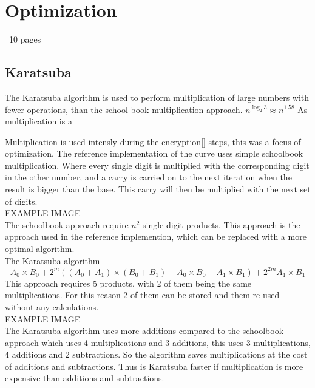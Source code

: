 \section{Optimization}
~10 pages

\subsection{Karatsuba}
The Karatsuba algorithm is used to perform multiplication of large numbers with fewer operations, than the school-book multiplication approach.
$n^{\log_{2}3} \approx n^{1.58}$
As multiplication is a 

Multiplication is used intensly during the encryption[] steps, this was a focus of optimization. The reference implementation of the curve uses simple schoolbook multiplication.
Where every single digit is multiplied with the corresponding digit in the other number, and a carry is carried on to the next iteration when the result is bigger than the base. This carry will then be multiplied with the next set of digits.\\
EXAMPLE IMAGE\\
The schoolbook approach require $n^{2}$ single-digit products. 
This approach is the approach used in the reference implemention, which can be replaced with a more optimal algorithm.
\\

The Karatsuba algorithm 
\[A_0 \times B_0 + 2^{m}((A_0 + A_1) \times (B_0 + B_1) - A_0 \times B_0 - A_1 \times B_1) + 2^{2m} A_1 \times B_1\]
This approach requires 5 products, with 2 of them being the same multiplications. For this reason 2 of them can be stored and them re-used without any calculations.
\\EXAMPLE IMAGE\\
The Karatsuba algorithm uses more additions compared to the schoolbook approach which uses 4 multiplications and 3 additions, this uses 3 multiplications, 4 additions and 2 subtractions. So the algorithm saves multiplications at the cost of additions and subtractions. Thus is Karatsuba faster if multiplication is more expensive than additions and subtractions. 

